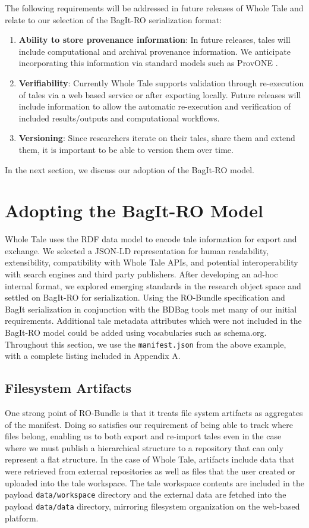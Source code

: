 \documentclass[conference]{IEEEtran}
\begin{document}
The following requirements will be addressed in future releases of Whole Tale and relate to our selection of the BagIt-RO serialization format:
\begin{enumerate}
\item{{\bf Ability to store provenance information}: In future
    releases, tales will include computational and archival provenance
    information. We anticipate incorporating this information via
    standard models such as ProvONE \cite{ProvONE}.}
\item{{\bf Verifiability}: Currently Whole Tale supports validation through re-execution of tales via a web based service or after exporting locally. Future releases will include information to allow the automatic re-execution and verification of included results/outputs and computational workflows.}
\item{{\bf Versioning}: Since researchers iterate on their tales, share them and extend them, it is important to be able to version them over time.}
\end{enumerate}

In the next section, we discuss our adoption of the BagIt-RO model.

\section{Adopting the BagIt-RO Model} \label{adopting}

Whole Tale uses the RDF data model to encode tale information for export and exchange. We selected  a JSON-LD representation for human readability, extensibility, compatibility with Whole Tale APIs, and potential interoperability with search engines and third party publishers. After developing an  ad-hoc internal format, we explored emerging standards in the research object space and settled on BagIt-RO for serialization. Using the RO-Bundle specification and BagIt serialization in conjunction with the BDBag tools met many of our initial requirements. Additional tale metadata attributes which were not included in the BagIt-RO model could be added using vocabularies such as schema.org. Throughout this section, we use the \texttt{manifest.json} from the above example, with a complete listing included in Appendix A.

\subsection{Filesystem Artifacts}
One strong point of RO-Bundle is that it treats file system artifacts as aggregates of the 
manifest. Doing so satisfies our requirement of being able to track where files belong, enabling 
us to both export and re-import tales even in the case where we must publish a hierarchical 
structure to a repository that can only represent a flat structure. In the case of Whole Tale, 
artifacts include data that were retrieved from external repositories as well as files that the user created or uploaded into the tale workspace. The tale workspace contents are included in the payload \texttt{data/workspace} directory and the external data are fetched into the payload \texttt{data/data} directory, mirroring filesystem organization on the web-based platform.
\end{document}

